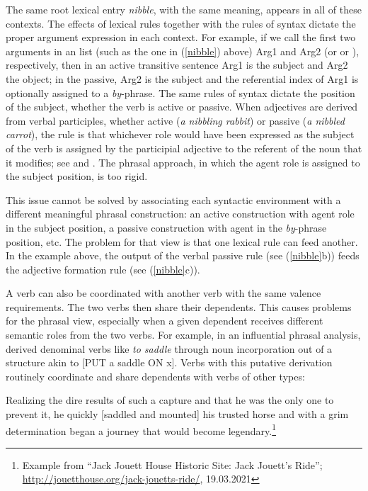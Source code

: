 \documentclass[output=paper
 	        ,biblatex
                ,babelshorthands
                ,newtxmath
                ,draftmode
                ,colorlinks, citecolor=brown
]{langscibook}
\begin{document}
The same root lexical entry \emph{nibble}, with the same meaning, appears in all of these contexts.
The effects of lexical rules together with the rules of syntax dictate the proper argument
expression in each context.  For example, if we call the first two arguments in an \argst list
(such as the one in (\ref{nibble}) above) Arg1 and Arg2 (or  or ), respectively, then in an active
transitive sentence Arg1 is the subject and Arg2 the object; in the passive, Arg2 is the subject and
the referential index of Arg1 is optionally assigned to a \emph{by}-phrase.  The same rules of
syntax dictate the position of the subject, whether the verb is active or passive.  When adjectives
are derived from verbal participles, whether active (\emph{a nibbling rabbit}) or passive (\emph{a
  nibbled carrot}), the rule is that whichever role would have been expressed as the subject of the
verb is assigned by the participial adjective to the referent of the noun that it modifies; see \citet[21--32]{Bresnan:1982passive}
and \citet[Chapter~3]{Bresnan+etal:2015}.  
The phrasal approach, in which the agent role is assigned to the subject position, is too rigid.  

This issue cannot be solved by associating each syntactic environment with a different meaningful phrasal construction: an active construction with agent role in the subject position, a passive construction with agent in the \textit{by}-phrase position, etc.  The problem for that view is that one lexical rule can feed another.  In the example above, the output of the verbal passive rule (see (\ref{nibble}b)) feeds the adjective formation rule (see (\ref{nibble}c)).  
 
A verb can also be coordinated with another verb with the same valence requirements.  The two verbs then share their dependents.  This causes problems for the phrasal view, especially when a given dependent receives different semantic roles from the two verbs.  For example, in an influential phrasal analysis, \citet{hale+keyser:1993}
derived denominal verbs like \textit{to saddle} through noun incorporation out of a structure akin to
[PUT a saddle ON x].  Verbs with this putative derivation routinely coordinate and share
dependents with verbs of other types: 

\begin{exe}
\ex Realizing the dire results of such a capture and that he was the only one to prevent it, he quickly
[saddled and mounted] his trusted horse and with a grim determination began a journey that would
become legendary.\footnote{Example from ``Jack Jouett House Historic Site: Jack Jouett's Ride''; \url{http://jouetthouse.org/jack-jouetts-ride/},
  19.03.2021}  
\end{exe}
\end{document}
